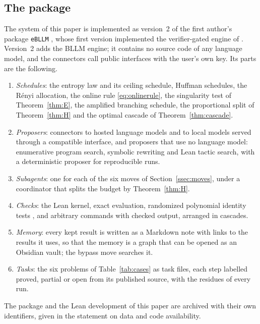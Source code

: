 \subsection{The package}\label{ssec:package}

The system of this paper is implemented as version~2 of the first author's package \texttt{eBLLM} \cite{Bha26c}, whose first version implemented the verifier-gated engine of \cite{Bha26a}. Version~2 adds the BLLM engine; it contains no source code of any language model, and the connectors call public interfaces with the user's own key. Its parts are the following.
\begin{enumerate}[label=(\alph*),leftmargin=1.8em,itemsep=1pt]
\item \emph{Schedules}: the entropy law and its ceiling schedule, Huffman schedules, the R\'enyi allocation, the online rule \eqref{eq:onlinerule}, the singularity test of Theorem~\ref{thm:E}, the amplified branching schedule, the proportional split of Theorem~\ref{thm:H} and the optimal cascade of Theorem~\ref{thm:cascade}.
\item \emph{Proposers}: connectors to hosted language models and to local models served through a compatible interface, and proposers that use no language model: enumerative program search, symbolic rewriting and Lean tactic search, with a deterministic proposer for reproducible runs.
\item \emph{Subagents}: one for each of the six moves of Section~\ref{ssec:moves}, under a coordinator that splits the budget by Theorem~\ref{thm:H}.
\item \emph{Checks}: the Lean kernel, exact evaluation, randomized polynomial identity tests \cite{Sch80,Zip79}, and arbitrary commands with checked output, arranged in cascades.
\item \emph{Memory}: every kept result is written as a Markdown note with links to the results it uses, so that the memory is a graph that can be opened as an Obsidian vault; the bypass move searches it.
\item \emph{Tasks}: the six problems of Table~\ref{tab:cases} as task files, each step labelled proved, partial or open from its published source, with the residues of every run.
\end{enumerate}
The package and the Lean development of this paper are archived with their own identifiers, given in the statement on data and code availability.
